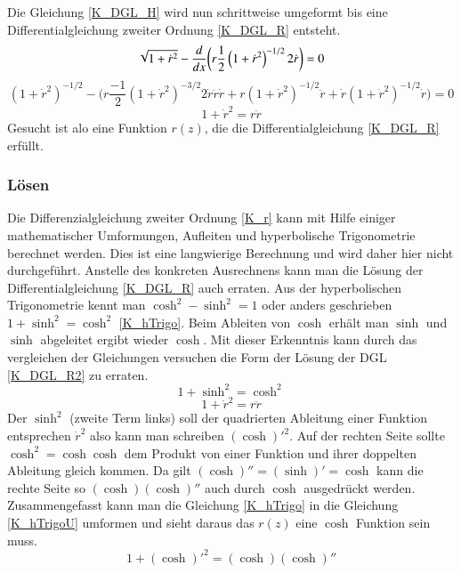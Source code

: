 \begin{refsection}
Die Gleichung \eqref{K_DGL_H} wird nun schrittweise umgeformt bis eine  Differentialgleichung zweiter Ordnung \eqref{K_DGL_R} entsteht.
\begin{equation} \label{K_DGL_H}
\sqrt{1+{\dot {r}}^2}-\frac{ d }{ dx } \bigg( r \frac{ 1 }{2  }\left( {1+{\dot {r}}^2}  \right)^{-1/2} 2 \dot {r}\bigg)=0
\\
\end{equation}
\begin{equation} \label{K_DGL_H2}
\left(1+{\dot {r}}^2  \right)^{-1/2}-\bigg(r \frac{ -1 }{2  } \left({1+{\dot {r}}^2}  \right)^{-3/2} 2 \dot{r} \ddot{r}  \dot{r}+ r \left({1+{\dot {r}}^2}  \right)^{-1/2} \ddot{r} +\dot{r} \left({1+{\dot {r}}^2}  \right)^{-1/2} \dot{r}\bigg)=0
\end{equation}
\begin{equation} \label{K_DGL_R}
1+{\dot {r}}^2=r  \ddot{r}
\end{equation}
Gesucht ist alo eine Funktion $r(z)$, die die Differentialgleichung \eqref{K_DGL_R} erfüllt.
\subsubsection{Lösen}
Die Differenzialgleichung zweiter Ordnung \eqref{K_r} kann mit Hilfe einiger mathematischer Umformungen, Aufleiten und hyperbolische Trigonometrie berechnet werden. 
Dies ist eine langwierige Berechnung und wird daher hier nicht durchgeführt.
Anstelle des konkreten Ausrechnens kann man die Lösung der Differentialgleichung \eqref{K_DGL_R} auch erraten. 
Aus der hyperbolischen Trigonometrie kennt man $\cosh^2-\sinh^2=1$ oder anders geschrieben $1+\sinh^2=\cosh^2$ \eqref{K_hTrigo}. Beim Ableiten von $\cosh$ erhält man $\sinh$ und $\sinh$ abgeleitet ergibt wieder $\cosh$. Mit dieser Erkenntnis kann durch das vergleichen der Gleichungen versuchen die Form der Lösung der DGL \eqref{K_DGL_R2} zu erraten. 
\begin{equation} \label{K_hTrigo}
1+\sinh^2=\cosh^2
\end{equation}
\begin{equation} \label{K_DGL_R2}
1+{\dot {r}}^2=r  \ddot{r}
\end{equation}
Der $\sinh^2$  (zweite Term links) soll der quadrierten Ableitung einer Funktion entsprechen ${\dot {r}}^2$ also kann man schreiben $(\cosh)'^2$. Auf der rechten Seite sollte $\cosh^2=\cosh \cosh$ dem Produkt von einer Funktion und ihrer doppelten Ableitung gleich kommen. Da gilt $(\cosh)''=(\sinh)'=\cosh$ kann die rechte Seite so $(\cosh) (\cosh)''$ auch durch $\cosh$ ausgedrückt werden. Zusammengefasst kann man die Gleichung \eqref{K_hTrigo} in die Gleichung \eqref{K_hTrigoU} umformen und sieht daraus das $r(z)$ eine $\cosh$ Funktion sein muss.
\begin{equation} \label{K_hTrigoU}
1+(\cosh)'^2=(\cosh) (\cosh)''
\end{equation}


\end{refsection}

